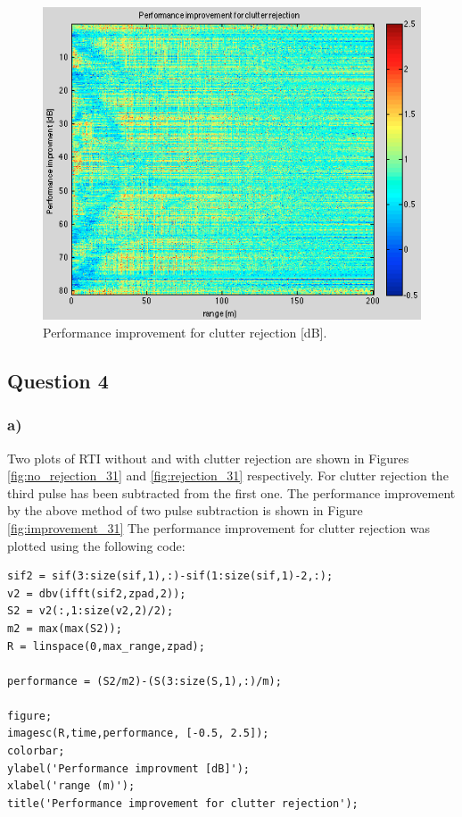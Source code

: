 \documentclass{article}
\begin{document}
\begin{figure}[ht]
\begin{minipage}[b]{0.33\linewidth}
\end{minipage}
\begin{minipage}[b]{0.33\linewidth}
\centering
\includegraphics[width=\textwidth]{Figures/improvement.png}
\caption{Performance improvement for clutter rejection [dB].}
\label{fig:improvement}
\end{minipage}
\end{figure}


\subsection{Question 4}
\subsubsection{a)}

Two plots of RTI without and with clutter rejection are shown in Figures \ref{fig:no_rejection_31} and \ref{fig:rejection_31} respectively. For clutter rejection the third pulse has been subtracted from the first one. The performance improvement by the above method of two pulse subtraction is shown in Figure \ref{fig:improvement_31}
The performance improvement for clutter rejection was plotted using the following code:
\begin{lstlisting}
sif2 = sif(3:size(sif,1),:)-sif(1:size(sif,1)-2,:);
v2 = dbv(ifft(sif2,zpad,2));
S2 = v2(:,1:size(v2,2)/2);
m2 = max(max(S2));
R = linspace(0,max_range,zpad);

performance = (S2/m2)-(S(3:size(S,1),:)/m);

figure;
imagesc(R,time,performance, [-0.5, 2.5]);
colorbar;
ylabel('Performance improvment [dB]');
xlabel('range (m)');
title('Performance improvement for clutter rejection');
\end{lstlisting}
\end{document}
